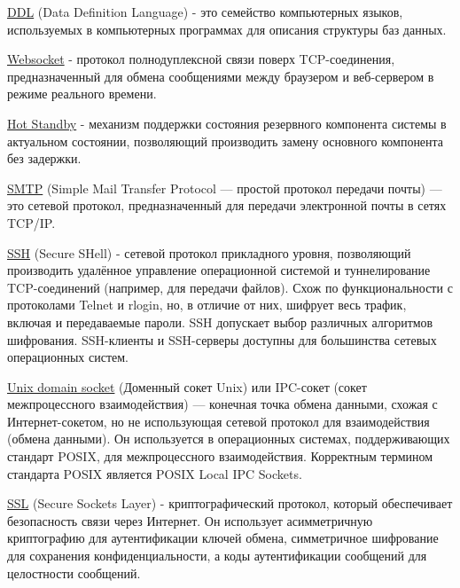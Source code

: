 \underline{DDL} (Data Definition Language) - это семейство компьютерных языков,
используемых в компьютерных программах для описания структуры баз данных.

\underline{Websocket} - протокол полнодуплексной связи поверх TCP-соединения,
предназначенный для обмена сообщениями между браузером и веб-сервером в режиме
реального времени.

\underline{Hot Standby} - механизм поддержки состояния резервного компонента
системы в актуальном состоянии, позволяющий производить замену основного
компонента без задержки.

\underline{SMTP} (Simple Mail Transfer Protocol — простой протокол передачи
почты) — это сетевой протокол, предназначенный для передачи электронной почты в
сетях TCP/IP.

\underline{SSH} (Secure SHell) - сетевой протокол прикладного уровня,
позволяющий производить удалённое управление операционной системой и
туннелирование TCP-соединений (например, для передачи файлов). Схож по
функциональности с протоколами Telnet и rlogin, но, в отличие от них, шифрует
весь трафик, включая и передаваемые пароли. SSH допускает выбор различных
алгоритмов шифрования. SSH-клиенты и SSH-серверы доступны для большинства
сетевых операционных систем.

\underline{Unix domain socket} (Доменный сокет Unix) или IPC-сокет (сокет
межпроцессного взаимодействия) — конечная точка обмена данными, схожая с
Интернет-сокетом, но не использующая сетевой протокол для взаимодействия (обмена
данными). Он используется в операционных системах, поддерживающих стандарт
POSIX, для межпроцессного взаимодействия. Корректным термином стандарта POSIX
является POSIX Local IPC Sockets.

\underline{SSL} (Secure Sockets Layer) - криптографический протокол, который
обеспечивает безопасность связи через Интернет. Он использует асимметричную
криптографию для аутентификации ключей обмена, симметричное шифрование для
сохранения конфиденциальности, а коды аутентификации сообщений для целостности
сообщений.
